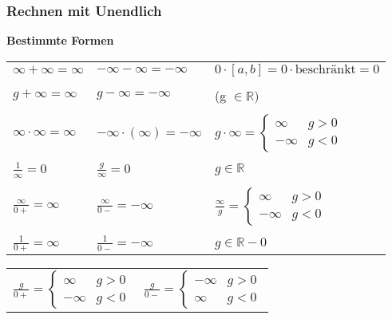 \subsubsection{Rechnen mit Unendlich}
    \textbf{Bestimmte Formen} \\
        \begin{tabular}{lll}
            $\infty + \infty = \infty$     & $-\infty - \infty = -\infty$          & $0 \cdot [a,b] = 0 \cdot \text{beschränkt} = 0$ \\
            \\
            $g + \infty = \infty$          & $g - \infty = -\infty$                & (g $\in \mathbb{R})$ \\
            \\ 
            $\infty \cdot \infty = \infty$ & $-\infty \cdot (\infty) = -\infty$    & $g \cdot \infty = 
                \begin{cases} 
                    \infty & g > 0 \\ 
                    -\infty & g < 0 
                \end{cases}$\\ 		
            \\
            $\frac{1}{\infty} = 0$         & $\frac{g}{\infty} = 0$                & $g \in \mathbb{R}$	\\
            \\
            $\frac{\infty}{0+} = \infty$   & $\frac{\infty}{0-} = -\infty$	       & $\frac{\infty}{g} = 
                \begin{cases}			
                    \infty & g > 0 \\
                    -\infty & g < 0
                \end{cases} $ \\
            \\
            $\frac{1}{0+} = \infty$        & $\frac{1}{0-} = -\infty$              & $g \in \mathbb{R} - {0}$ \\
        \end{tabular}

        \begin{tabular}{ll}
        $\frac{g}{0+} = \begin{cases}					
                        \infty & g > 0 \\
                        -\infty & g < 0
                        \end{cases} $ &
        $\frac{g}{0-} = \begin{cases}				
                        -\infty & g > 0 \\
                        \infty & g < 0
                        \end{cases}$ \\ 
        \end{tabular}
    
